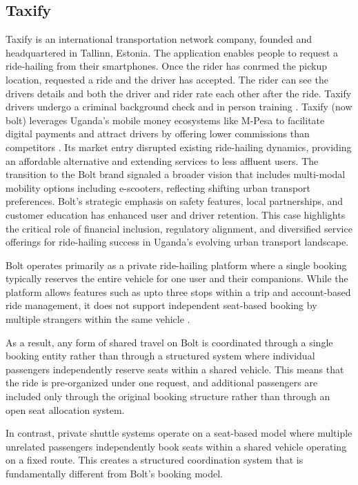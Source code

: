 \subsection{Taxify}
Taxify is an international transportation network company, founded and
headquartered in Tallinn, Estonia. The application enables people to request a
ride-hailing from their smartphones. Once the rider has conrmed the pickup
location, requested a ride and the driver has accepted. The rider can see the
drivers details and both the driver and rider rate each other after the ride.
Taxify drivers undergo a criminal background check and in person training
\cite{taxify2018centralasia}. Taxify (now bolt) leverages Uganda’s mobile money
ecosystems like M-Pesa to facilitate digital payments and attract drivers by
offering lower commissions than competitors\cite{aPurple_BoltBusinessModel}
\cite{Quartz_TaxifyToBolt}. Its market entry disrupted existing ride-hailing
dynamics, providing an affordable alternative and extending services to less
affluent users. The transition to the Bolt brand signaled a broader vision that
includes multi-modal mobility options including e-scooters, reflecting shifting
urban transport preferences. Bolt's strategic emphasis on safety features, local
partnerships, and customer education has enhanced user and driver retention.
This case highlights the critical role of financial inclusion, regulatory
alignment, and diversified service offerings for ride-hailing success in
Uganda’s evolving urban transport landscape\cite{Pctech_TaxifyUganda2017}.


Bolt operates primarily as a private ride-hailing platform where a single
booking typically reserves the entire vehicle for one user and their companions.
While the platform allows features such as upto three stops within a trip and
account-based ride management, it does not support independent seat-based
booking by multiple strangers within the same vehicle
\cite{Salmon2023RideHailingMonitor}.


As a result, any form of shared travel on Bolt is coordinated through a single
booking entity rather than through a structured system where individual
passengers independently reserve seats within a shared vehicle. This means that
the ride is pre-organized under one request, and additional passengers are
included only through the original booking structure rather than through an open
seat allocation system.


In contrast, private shuttle systems operate on a seat-based model where
multiple unrelated passengers independently book seats within a shared vehicle
operating on a fixed route. This creates a structured coordination system that
is fundamentally different from Bolt’s booking model.


